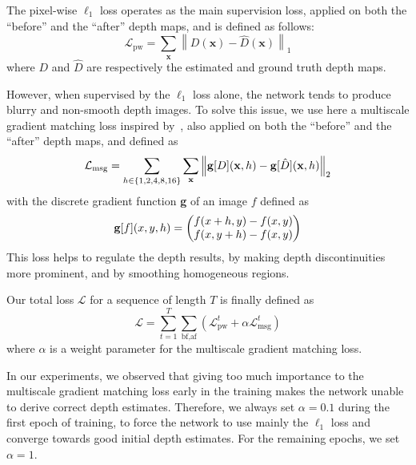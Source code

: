 The pixel-wise \(\ell_1\) loss operates as the main supervision loss, applied on both the ``before'' and the ``after'' depth maps, and is defined as follows:
\begin{equation}
  \mathcal{L}_\text{pw} = \sum_{\mathbf{x}} \left\lVert D(\mathbf{x}) - \hat{D}(\mathbf{x}) \right\rVert _1
\end{equation}
where \(D\) and \(\hat{D}\) are respectively the estimated and ground truth depth maps. 

However, when supervised by the \(\ell_1\) loss alone, the network tends to produce blurry and non-smooth depth images. To solve this issue, we use here a multiscale gradient matching loss inspired by~\cite{Ummenhofer2017DeMoNDA}, also applied on both the ``before'' and the ``after'' depth maps, and defined as
\begin{equation}
  \mathcal{L}_\text{msg} = \sum_{h \in \{1, 2, 4, 8, 16\}} \sum_{\mathbf{x}} \left\lVert \text{\textbf{g}}[D](\mathbf{x}, h) - \text{\textbf{g}}[\hat{D}](\mathbf{x}, h) \right\rVert _2
\end{equation}
with the discrete gradient function \textbf{g} of an image \(f\) defined as
\begin{equation}
  \text{\textbf{g}}[f](x, y, h) = \begin{pmatrix} f(x+h, y) - f(x, y)\\ f(x, y+h) - f(x, y) \end{pmatrix}
\end{equation}
This loss helps to regulate the depth results, by making depth discontinuities more prominent, and by smoothing homogeneous regions.

Our total loss \(\mathcal{L}\) for a sequence of length \(T\) is finally defined as
\begin{equation}
  \mathcal{L} = \sum_{t=1}^T \sum_{\text{bf}, \text{af}} (\mathcal{L}_{\text{pw}}^t + \alpha \mathcal{L}_{\text{msg}}^t)
\end{equation}
where \(\alpha\) is a weight parameter for the multiscale gradient matching loss.

In our experiments, we observed that giving too much importance to the multiscale gradient matching loss early in the training makes the network unable to derive correct depth estimates. Therefore, we always set \(\alpha = 0.1\) during the first epoch of training, to force the network to use mainly the \(\ell_1\) loss and converge towards good initial depth estimates. For the remaining epochs, we set \(\alpha = 1\).


